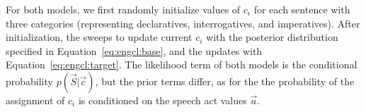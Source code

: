 For both models, we first randomly initialize values of $c_{i}$ for each sentence with three categories (representing declaratives, interrogatives, and imperatives). After initialization, the \dlearnerabbr{} sweeps to update current $c_{i}$ with the posterior distribution specified in Equation~\ref{eq:engcl:base}, and the \plearnerabbr{} updates with Equation~\ref{eq:engcl:target}. The likelihood term of both models is the conditional probability $p(\vec{S}|\vec{c})$, but the prior terms differ, as for the \plearnerabbr{} the probability of the assignment of $c_{i}$ is conditioned on the speech act values $\vec{a}$. 

